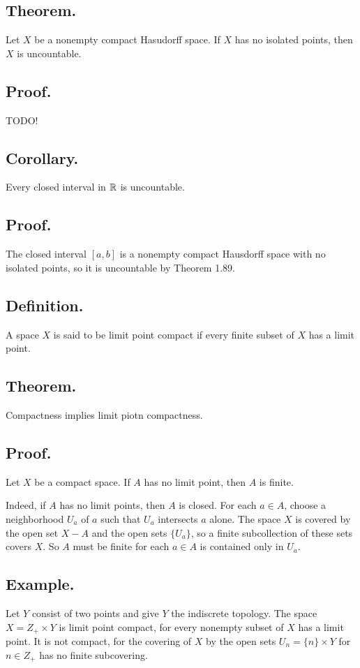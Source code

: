 \documentclass[titlepage]{article}
\begin{document}
\subsection{Theorem.} Let $X$ be a nonempty compact Hasudorff space. If $X$ has no isolated points, then $X$ is uncountable.

\subsection{Proof.} TODO!

\subsection{Corollary.} Every closed interval in $\mathbb{R}$ is uncountable.

\subsection{Proof.} The closed interval $[a, b]$ is a nonempty compact Hausdorff space with no isolated points, so it is uncountable by Theorem 1.89.

\subsection{Definition.} A space $X$ is said to be limit point compact if every finite subset of $X$ has a limit point.

\subsection{Theorem.} Compactness implies limit piotn compactness.

\subsection{Proof.} Let $X$ be a compact space. If $A$ has no limit point, then $A$ is finite.

Indeed, if $A$ has no limit points, then $A$ is closed. For each $a \in A$, choose a neighborhood $U_{a}$ of $a$ such that $U_{a}$ intersects $a$ alone. The space $X$ is covered by the open set $X - A$ and the open sets $\{U_{a}\}$, so a finite subcollection of these sets covers $X$. So $A$ must be finite for each $a \in A$ is contained only in $U_{a}$.

\subsection{Example.} Let $Y$ consist of two points and give $Y$ the indiscrete topology. The space $X = Z_{+} \times Y$ is limit point compact, for every nonempty subset of $X$ has a limit point. It is not compact, for the covering of $X$ by the open sets $U_{n} = \{n\} \times Y$ for $n \in Z_{+}$ has no finite subcovering.
\end{document}
